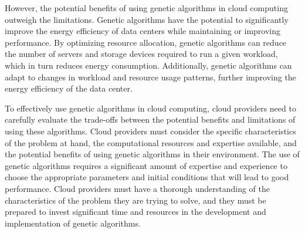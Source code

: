 However, the potential benefits of using genetic algorithms in cloud computing outweigh the limitations. 
Genetic algorithms have the potential to significantly improve the energy efficiency of data centers while maintaining or improving performance. 
By optimizing resource allocation, genetic algorithms can reduce the number of servers and storage devices required to run a given workload, 
which in turn reduces energy consumption. Additionally, genetic algorithms can adapt to changes in workload and resource usage patterns, 
further improving the energy efficiency of the data center.

To effectively use genetic algorithms in cloud computing, cloud providers need to carefully evaluate the trade-offs between the potential benefits and limitations of using these algorithms. 
Cloud providers must consider the specific characteristics of the problem at hand, the computational resources and expertise available, 
and the potential benefits of using genetic algorithms in their environment. 
The use of genetic algorithms requires a significant amount of expertise and experience to choose the appropriate parameters and initial conditions 
that will lead to good performance. Cloud providers must have a thorough understanding of the characteristics of the problem they are trying to solve, 
and they must be prepared to invest significant time and resources in the development and implementation of genetic algorithms.